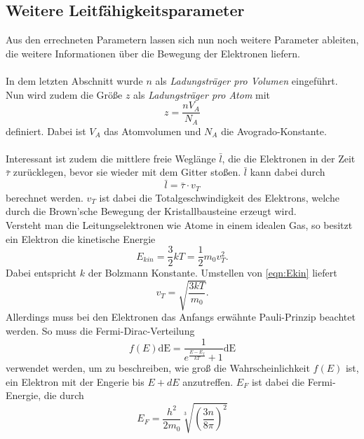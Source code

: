 \subsection{Weitere Leitfähigkeitsparameter}
Aus den errechneten Parametern lassen sich nun noch weitere Parameter ableiten, die weitere Informationen
über die Bewegung der Elektronen liefern.\\\\
In dem letzten Abschnitt wurde $n$ als \textit{Ladungsträger pro Volumen} eingeführt. Nun wird zudem die
Größe $z$ als \textit{Ladungsträger pro Atom} mit
\begin{equation}
    z=\frac{n V_{A}}{N_A}\label{eqn:z}
\end{equation}
definiert. Dabei ist $V_{A}$ das Atomvolumen und $N_A$ die Avogrado-Konstante.\\\\
Interessant ist zudem die mittlere freie Weglänge $\bar{l}$, die die Elektronen in der Zeit $\bar{\tau}$ zurücklegen, bevor
sie wieder mit dem Gitter stoßen. $\bar{l}$ kann dabei durch
\begin{equation*}
    \bar{l}=\bar{\tau}\cdot v_T
\end{equation*}
berechnet werden. $v_T$ ist dabei die Totalgeschwindigkeit des Elektrons, welche durch die Brown'sche Bewegung
der Kristallbausteine erzeugt wird.\\
Versteht man die Leitungselektronen wie Atome in einem idealen Gas, so besitzt ein Elektron die kinetische Energie
\begin{equation}
    E_{kin}=\frac{3}{2}kT=\frac{1}{2}m_0v_T^2 . \label{eqn:Ekin}
\end{equation}
Dabei entspricht $k$ der Bolzmann Konstante. Umstellen von \eqref{eqn:Ekin} liefert
\begin{equation}
    v_T=\sqrt{\frac{3kT}{m_0}}. \label{eqn:vT1}
\end{equation}
Allerdings muss bei den Elektronen das Anfangs erwähnte Pauli-Prinzip beachtet werden. So muss die Fermi-Dirac-Verteilung
\begin{equation*}
    f(E)\text{dE}=\frac{1}{e^{\frac{E-E_f}{kT}}+1}\text{dE}
\end{equation*}
verwendet werden, um zu beschreiben, wie groß die Wahrscheinlichkeit $f(E)$ ist, ein
Elektron mit der Engerie bis $E+dE$ anzutreffen. $E_F$ ist dabei die Fermi-Energie, die durch
\begin{equation}
    E_F=\frac{h^2}{2m_0}\sqrt[3]{\left(\frac{3n}{8\pi}\right)^2} \label{eqn:EF}
\end{equation}
